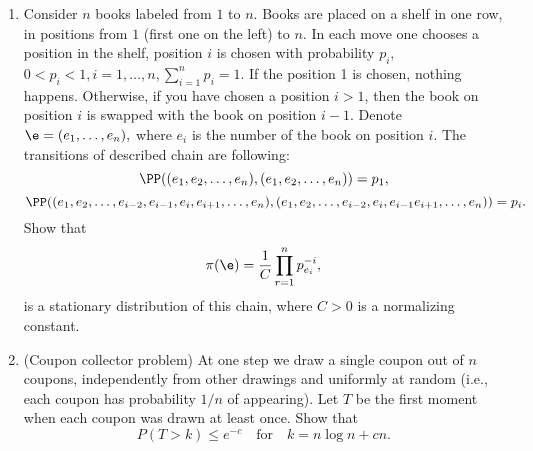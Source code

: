 \documentclass[a4paper,12pt]{article}
\begin{document}
\begin{enumerate}
\item Consider $n$ books labeled from $1$ to $n.$ Books are placed on a shelf in one row, in positions from $1$ (first one on the left) to $n.$ In each move one chooses a position in the shelf, position 
$i$ is chosen with probability $p_i,$ $0<p_i<1, i=1,\ldots,n, \sum_{i=1}^n p_i=1.$ 
If the  position 1 is chosen, nothing happens. Otherwise, if you have chosen a position $i>1$, then
the book on position $i$ is swapped with the book on position $i-1$.
Denote $\e=(e_1,\ldots,e_n),$ where $e_i$ is the number of the book on position $i$. 
The transitions of described chain are following:
$$\PP((e_1,e_2,\ldots,e_n),(e_1,e_2,\ldots,e_n))=p_1,$$
$$\PP((e_1,e_2,\ldots,e_{i-2},e_{i-1},e_i, e_{i+1},\ldots, e_n),(e_1,e_2,\ldots,e_{i-2},e_i,e_{i-1} e_{i+1},\ldots, e_n))=p_i.$$
Show that 
$$\pi(\e)={1\over C} \prod_{r=1}^n p_{e_i}^{-i},$$
is a stationary distribution of this chain, where $C>0$ is a normalizing constant.

\item 
(Coupon collector problem) At one step we draw a single coupon out of $n$ coupons, independently from other drawings and uniformly at random
(i.e., each coupon has probability $1/n$ of appearing). Let $T$ be the first moment when
each coupon was drawn at least once.
Show that
$$P(T>k) \leq e^{-c} \quad \textrm{for} \quad k=n\log n+cn.$$
 
\end{enumerate}
\end{document}
